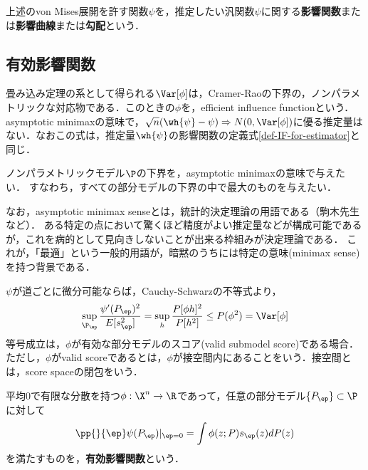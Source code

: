 \documentclass[uplatex,dvipdfmx]{jsreport}
\begin{document}
\begin{definition}
    上述のvon Mises展開を許す関数$\psi$を，推定したい汎関数$\psi$に関する\textbf{影響関数}または\textbf{影響曲線}または\textbf{勾配}という．
\end{definition}

\subsection{有効影響関数}

\begin{tcolorbox}[colframe=ForestGreen, colback=ForestGreen!10!white,breakable,colbacktitle=ForestGreen!40!white,coltitle=black,fonttitle=\bfseries\sffamily,
title=]
    畳み込み定理の系として得られる$\Var[\phi]$は，Cramer-Raoの下界の，ノンパラメトリックな対応物である．このときの$\phi$を，efficient influence functionという．
    asymptotic minimaxの意味で，$\sqrt{n}(\wh{\psi}-\psi)\Rightarrow N(0,\Var[\phi])$に優る推定量はない．なおこの式は，推定量$\wh{\psi}$の影響関数の定義式\ref{def-IF-for-estimator}と同じ．
\end{tcolorbox}

\begin{problem}
    ノンパラメトリックモデル$\P$の下界を，asymptotic minimaxの意味で与えたい．
    すなわち，すべての部分モデルの下界の中で最大のものを与えたい．
\end{problem}
\begin{remark}
    なお，asymptotic minimax senseとは，統計的決定理論の用語である（駒木先生など）．
    ある特定の点において驚くほど精度がよい推定量などが構成可能であるが，これを病的として見向きしないことが出来る枠組みが決定理論である．
    これが，「最適」という一般的用語が，暗黙のうちには特定の意味(minimax sense)を持つ背景である．
\end{remark}
\begin{discussion}
    $\psi$が道ごとに微分可能ならば，Cauchy-Schwarzの不等式より，
    \[\sup_{\P_\ep}\frac{\psi'(P_\ep)^2}{E[s^2_\ep]}=\sup_{h}\frac{P[\phi h]^2}{P[h^2]}\le P(\phi^2)=\Var[\phi]\]
    等号成立は，$\phi$が有効な部分モデルのスコア(valid submodel score)である場合．ただし，$\phi$がvalid scoreであるとは，$\phi$が接空間内にあることをいう．接空間とは，score spaceの閉包をいう．
\end{discussion}

\begin{definition}
    平均$0$で有限な分散を持つ$\phi:\X^n\to\R$であって，任意の部分モデル$\{P_\ep\}\subset\P$に対して
    \[\pp{}{\ep}\psi(P_\ep)|_{\ep=0}=\int\phi(z;P)s_{\ep}(z)dP(z)\]
    を満たすものを，\textbf{有効影響関数}という．
\end{definition}
\end{document}
